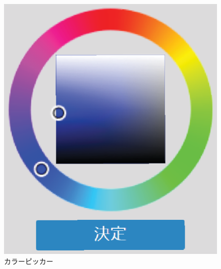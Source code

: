 \begin{figure}[htbp]
    \begin{center}
        \centering
        \includegraphics[scale=0.5]{image/color_picker.eps}
        \caption{カラーピッカー}
        \label{color_picker}
    \end{center}
\end{figure}


